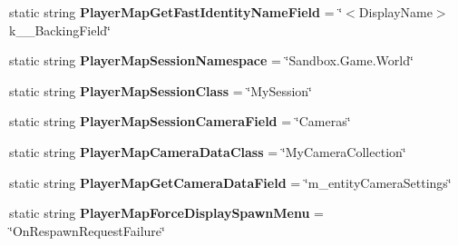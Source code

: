 \begin{DoxyCompactItemize}
\item 
\hypertarget{class_s_e_mod_a_p_i_internal_1_1_a_p_i_1_1_common_1_1_player_map_aba1f8cb0428c91d79aa7de3c81ccd3a0}{}static string {\bfseries Player\+Map\+Get\+Fast\+Identity\+Name\+Field} = \char`\"{}$<$Display\+Name$>$k\+\_\+\+\_\+\+Backing\+Field\char`\"{}\label{class_s_e_mod_a_p_i_internal_1_1_a_p_i_1_1_common_1_1_player_map_aba1f8cb0428c91d79aa7de3c81ccd3a0}

\item 
\hypertarget{class_s_e_mod_a_p_i_internal_1_1_a_p_i_1_1_common_1_1_player_map_a2c8206c005fb392491fad76383a647f8}{}static string {\bfseries Player\+Map\+Session\+Namespace} = \char`\"{}Sandbox.\+Game.\+World\char`\"{}\label{class_s_e_mod_a_p_i_internal_1_1_a_p_i_1_1_common_1_1_player_map_a2c8206c005fb392491fad76383a647f8}

\item 
\hypertarget{class_s_e_mod_a_p_i_internal_1_1_a_p_i_1_1_common_1_1_player_map_a3a47ef2f9fb2e755db553e403cf51f37}{}static string {\bfseries Player\+Map\+Session\+Class} = \char`\"{}My\+Session\char`\"{}\label{class_s_e_mod_a_p_i_internal_1_1_a_p_i_1_1_common_1_1_player_map_a3a47ef2f9fb2e755db553e403cf51f37}

\item 
\hypertarget{class_s_e_mod_a_p_i_internal_1_1_a_p_i_1_1_common_1_1_player_map_a70769c5dfe6924d302f55e7f3a6c9bb5}{}static string {\bfseries Player\+Map\+Session\+Camera\+Field} = \char`\"{}Cameras\char`\"{}\label{class_s_e_mod_a_p_i_internal_1_1_a_p_i_1_1_common_1_1_player_map_a70769c5dfe6924d302f55e7f3a6c9bb5}

\item 
\hypertarget{class_s_e_mod_a_p_i_internal_1_1_a_p_i_1_1_common_1_1_player_map_ad5c4c80c0895f1b3bb471958079a4d58}{}static string {\bfseries Player\+Map\+Camera\+Data\+Class} = \char`\"{}My\+Camera\+Collection\char`\"{}\label{class_s_e_mod_a_p_i_internal_1_1_a_p_i_1_1_common_1_1_player_map_ad5c4c80c0895f1b3bb471958079a4d58}

\item 
\hypertarget{class_s_e_mod_a_p_i_internal_1_1_a_p_i_1_1_common_1_1_player_map_a3f23eaf4ede6b871a581aee867122042}{}static string {\bfseries Player\+Map\+Get\+Camera\+Data\+Field} = \char`\"{}m\+\_\+entity\+Camera\+Settings\char`\"{}\label{class_s_e_mod_a_p_i_internal_1_1_a_p_i_1_1_common_1_1_player_map_a3f23eaf4ede6b871a581aee867122042}

\item 
\hypertarget{class_s_e_mod_a_p_i_internal_1_1_a_p_i_1_1_common_1_1_player_map_a8cf3299249fb2c6d2fa56bc3f780a664}{}static string {\bfseries Player\+Map\+Force\+Display\+Spawn\+Menu} = \char`\"{}On\+Respawn\+Request\+Failure\char`\"{}\label{class_s_e_mod_a_p_i_internal_1_1_a_p_i_1_1_common_1_1_player_map_a8cf3299249fb2c6d2fa56bc3f780a664}


\end{DoxyCompactItemize}
